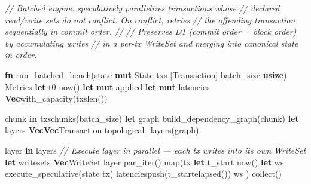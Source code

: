 \documentclass[11pt,a4paper]{article}
\providecommand{\NormalTok}[1]{#1}
\providecommand{\KeywordTok}[1]{\textbf{#1}}
\providecommand{\DataTypeTok}[1]{\textbf{#1}}
\providecommand{\CommentTok}[1]{\textit{#1}}
\newenvironment{Shaded}{}{}
\newenvironment{Highlighting}[1][]{\par\noindent\begin{minipage}{\linewidth}\ttfamily\small}{\end{minipage}\par}
\begin{document}
\begin{Shaded}
\begin{Highlighting}[]
\CommentTok{// Batched engine: speculatively parallelizes transactions whose}
\CommentTok{// declared read/write sets do not conflict. On conflict, retries}
\CommentTok{// the offending transaction sequentially in commit order.}
\CommentTok{//}
\CommentTok{// Preserves D1 (commit order = block order) by accumulating writes}
\CommentTok{// in a per{-}tx WriteSet and merging into canonical state in order.}

\KeywordTok{fn}\NormalTok{ run\_batched\_bench(state}\OperatorTok{:} \OperatorTok{\&}\KeywordTok{mut}\NormalTok{ State}\OperatorTok{,}\NormalTok{ txs}\OperatorTok{:} \OperatorTok{\&}\NormalTok{[Transaction]}\OperatorTok{,}\NormalTok{ batch\_size}\OperatorTok{:} \DataTypeTok{usize}\NormalTok{) }\OperatorTok{{-}\textgreater{}}\NormalTok{ Metrics }\OperatorTok{\{}
    \KeywordTok{let}\NormalTok{ t0 }\OperatorTok{=} \NormalTok{now()}\OperatorTok{;}
    \KeywordTok{let} \KeywordTok{mut}\NormalTok{ applied }\OperatorTok{=} \OperatorTok{;}
    \KeywordTok{let} \KeywordTok{mut}\NormalTok{ latencies }\OperatorTok{=} \DataTypeTok{Vec}\PreprocessorTok{::}\NormalTok{with\_capacity(txs}\NormalTok{len())}\OperatorTok{;}

    \NormalTok{ chunk }\KeywordTok{in}\NormalTok{ txs}\NormalTok{chunks(batch\_size) }\OperatorTok{\{}
        \KeywordTok{let}\NormalTok{ graph }\OperatorTok{=}\NormalTok{ build\_dependency\_graph(chunk)}\OperatorTok{;}
        \KeywordTok{let}\NormalTok{ layers}\OperatorTok{:} \DataTypeTok{Vec}\OperatorTok{\textless{}}\DataTypeTok{Vec}\OperatorTok{\textless{}\&}\NormalTok{Transaction}\OperatorTok{\textgreater{}\textgreater{}} \OperatorTok{=}\NormalTok{ topological\_layers(}\OperatorTok{\&}\NormalTok{graph)}\OperatorTok{;}

        \NormalTok{ layer }\KeywordTok{in}\NormalTok{ layers }\OperatorTok{\{}
            \CommentTok{// Execute layer in parallel — each tx writes into its own WriteSet}
            \KeywordTok{let}\NormalTok{ writesets}\OperatorTok{:} \DataTypeTok{Vec}\OperatorTok{\textless{}}\NormalTok{WriteSet}\OperatorTok{\textgreater{}} \OperatorTok{=}\NormalTok{ layer}
                \NormalTok{par\_iter()}
                \NormalTok{map(}\OperatorTok{|}\NormalTok{tx}\OperatorTok{|} \OperatorTok{\{}
                    \KeywordTok{let}\NormalTok{ t\_start }\OperatorTok{=} \NormalTok{now()}\OperatorTok{;}
                    \KeywordTok{let}\NormalTok{ ws }\OperatorTok{=}\NormalTok{ execute\_speculative(state}\OperatorTok{,}\NormalTok{ tx)}\OperatorTok{;}
\NormalTok{                    latencies}\NormalTok{push(t\_start}\NormalTok{elapsed())}\OperatorTok{;}
\NormalTok{                    ws}
                \OperatorTok{\}}\NormalTok{)}
                \NormalTok{collect()}\OperatorTok{;}


\end{Highlighting}
\end{Shaded}
\end{document}
